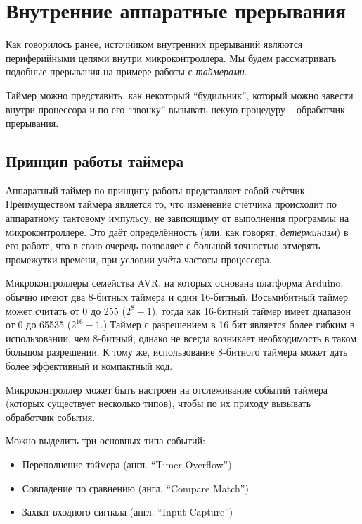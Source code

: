 \documentclass[../sparc.tex]{subfiles}
\begin{document}
\newpage
\section{Внутренние аппаратные прерывания}

Как говорилось ранее, источником внутренних прерываний являются периферийными
цепями внутри микроконтроллера.  Мы будем рассматривать подобные прерывания на
примере работы с \emph{таймерами}.

Таймер можно представить, как некоторый ``будильник'', который можно завести
внутри процессора и по его ``звонку'' вызывать некую процедуру -- обработчик
прерывания.

\subsection{Принцип работы таймера}

Аппаратный таймер по принципу работы представляет собой счётчик.  Преимуществом
таймера является то, что изменение счётчика происходит по аппаратному тактовому
импульсу, не зависящиму от выполнения программы на микроконтроллере.  Это даёт
определённость (или, как говорят, \emph{детерминизм}) в его работе, что в свою
очередь позволяет с большой точностью отмерять промежутки времени, при условии
учёта частоты процессора.

Микроконтроллеры семейства AVR, на которых основана платформа Arduino, обычно
имеют два 8-битных таймера и один 16-битный.  Восьмибитный таймер может считать
от 0 до 255 ($2^{8}-1$), тогда как 16-битный таймер имеет диапазон от 0 до 65535
($2^{16}-1$.)  Таймер с разрешением в 16 бит является более гибким в
использовании, чем 8-битный, однако не всегда возникает необходимость в таком
большом разрешении.  К тому же, использование 8-битного таймера может дать более
эффективный и компактный код.\cite{avr:timers}

Микроконтроллер может быть настроен на отслеживание событий таймера (которых
существует несколько типов), чтобы по их приходу вызывать обработчик события.

Можно выделить три основных типа событий:
\begin{itemize}
\item Переполнение таймера (англ. ``Timer Overflow'')
\item Совпадение по сравнению (англ. ``Compare Match'')
\item Захват входного сигнала (англ. ``Input Capture'')
\end{itemize}
\end{document}

